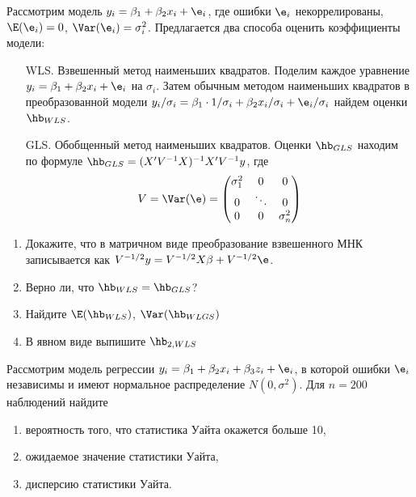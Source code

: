 \documentclass[pdftex,11pt,openany]{book}\usepackage[]{graphicx}\usepackage[]{color}
\begin{document}
\begin{problem}
Рассмотрим модель $y_i=\beta_1+\beta_2 x_i+\e_i$, где ошибки $\e_i$ некоррелированы, $\E(\e_i)=0$, $\Var(\e_i)=\sigma^2_i$. Предлагается два способа оценить коэффициенты модели:
\begin{enumerate}
\item[WLS.] Взвешенный метод наименьших квадратов. Поделим каждое уравнение $y_i=\beta_1+\beta_2 x_i+\e_i$ на $\sigma_i$. Затем обычным методом наименьших квадратов в преобразованной модели $y_i/\sigma_i=\beta_1\cdot 1/\sigma_i+\beta_2 x_i/\sigma_i+\e_i/\sigma_i$ найдем оценки $\hb_{WLS}$.
\item[GLS.] Обобщенный метод наименьших квадратов. Оценки $\hb_{GLS}$ находим по формуле $\hb_{GLS}=(X'V^{-1}X)^{-1}X'V^{-1}y$, где
\[
V=\Var(\e)=\begin{pmatrix}
\sigma^2_1 & 0 & 0 \\
0 & \ddots & 0 \\
0 & 0 & \sigma^2_n
\end{pmatrix}
\]
\end{enumerate}
\begin{enumerate}
\item Докажите, что в матричном виде преобразование взвешенного МНК записывается как $V^{-1/2}y=V^{-1/2}X\beta+V^{-1/2}\e$.
\item Верно ли, что $\hb_{WLS}=\hb_{GLS}$?
\item Найдите $\E(\hb_{WLS})$, $\Var(\hb_{WLGS})$
\item В явном виде выпишите $\hb_{2,WLS}$
\end{enumerate}
\end{problem}

\begin{solution}
\end{solution}



\begin{problem}
Рассмотрим модель регрессии $y_i=\beta_1+\beta_2 x_i + \beta_3 z_i+\e_i$, в которой
ошибки $\e_i$ независимы и имеют нормальное распределение $N(0,\sigma^2)$. Для $n = 200$ наблюдений найдите
\begin{enumerate}
\item вероятность того, что статистика Уайта окажется больше 10,
\item ожидаемое значение статистики Уайта,
\item дисперсию статистики Уайта.
\end{enumerate}
\end{problem}
\end{document}
